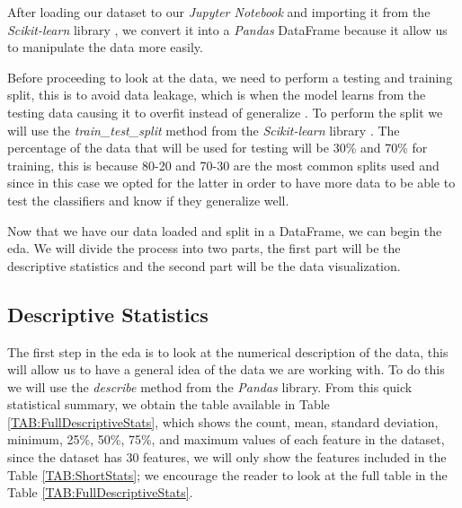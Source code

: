 After loading our dataset \cite{william_wolberg_breast_1993} to our \textit{Jupyter Notebook} and importing it from the \textit{Scikit-learn} library \cite{scikit_learn_sklearndatasetsload_breast_cancer_nodate}, we convert it into a \textit{Pandas}\cite{team_pandas-devpandas_2020} DataFrame because it allow us to manipulate the data more easily.

Before proceeding to look at the data, we need to perform a testing and training split, this is to avoid data leakage, 
which is when the model learns from the testing data causing it to overfit instead of generalize \cite{wang_machine_2020}. 
To perform the split we will use the \textit{train\_test\_split} method from the \textit{Scikit-learn} library \cite{pedregosa_scikit-learn_2011}. 
The percentage of the data that will be used for testing will be 30\% and 70\% for training, this is because 80-20 and 70-30 are the most common splits used \cite{racz_effect_2021} 
and since in this case we opted for the latter in order to have more data to be able 
to test the classifiers and know if they generalize well.

Now that we have our data loaded and split in a DataFrame, we can begin the \ac{eda}. We will divide the process into two parts, the first part will be the descriptive statistics and the second part will be the data visualization.

\subsection{Descriptive Statistics}

The first step in the \ac{eda} is to look at the numerical description of the data, this will allow us to have a general idea of the data we are working with. To do this we will use the \textit{describe} method from the \textit{Pandas} library. From this quick statistical summary, we obtain the table available in Table \ref{TAB:FullDescriptiveStats}, which shows the count, mean, standard deviation, minimum, 25\%, 50\%, 75\%, and maximum values of each feature in the dataset, since the dataset has 30 features, we will only show the features included in the Table \ref{TAB:ShortStats}; we encourage the reader to look at the full table in the Table \ref{TAB:FullDescriptiveStats}.

